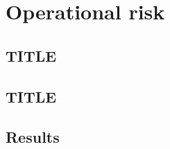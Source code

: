 \chapter{Operational risk}
\label{ch:oprisk}


\section{TITLE}
\label{sec:m24}


\section{TITLE}
\label{sec:m32}


\section{Results}
\label{sec:results-oprisk}

